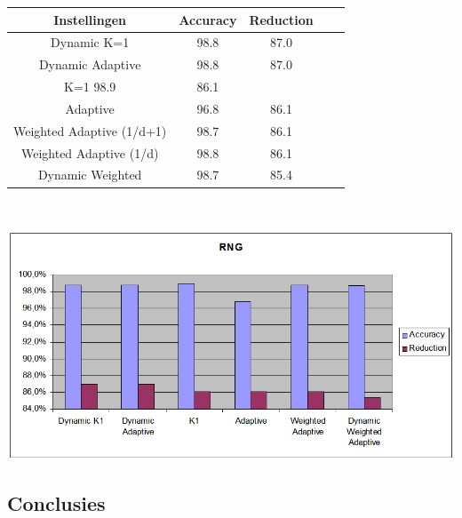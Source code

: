 \documentclass{article}
\begin{document}
\begin{tabular}{|c|c|c|c|c|}  \hline
Instellingen & Accuracy &	Reduction \\ \hline
Dynamic K=1	&	98.8 &  87.0 \\
Dynamic Adaptive &		98.8 &  87.0 \\
K=1					98.9 & 86.1 \\
Adaptive &			96.8  & 86.1 \\
Weighted Adaptive (1/d+1) &	98.7& 86.1 \\
Weighted Adaptive (1/d) &	98.8  & 86.1 \\
Dynamic Weighted &			98.7 & 85.4 \\ \hline
\end{tabular} \\

\begin{center} \includegraphics[scale=0.5]{dynamic_vs_1st_karakter} \end{center}

\subsection{Conclusies}
\end{document}
